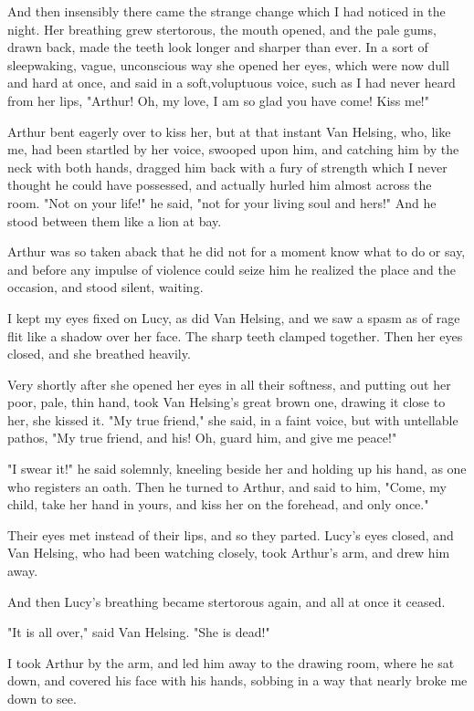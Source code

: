 And then insensibly there came the strange change which I had noticed in the night. Her breathing grew stertorous, the mouth opened, and the pale gums, drawn back, made the teeth look longer and sharper than ever. In a sort of sleepwaking, vague, unconscious way she opened her eyes, which were now dull and hard at once, and said in a soft,voluptuous voice, such as I had never heard from her lips, "Arthur! Oh, my love, I am so glad you have come! Kiss me!" 

Arthur bent eagerly over to kiss her, but at that instant Van Helsing, who, like me, had been startled by her voice, swooped upon him, and catching him by the neck with both hands, dragged him back with a fury of strength which I never thought he could have possessed, and actually hurled him almost across the room. "Not on your life!" he said, "not for your living soul and hers!" And he stood between them like a lion at bay. 

Arthur was so taken aback that he did not for a moment know what to do or say, and before any impulse of violence could seize him he realized the place and the occasion, and stood silent, waiting. 

I kept my eyes fixed on Lucy, as did Van Helsing, and we saw a spasm as of rage flit like a shadow over her face. The sharp teeth clamped together. Then her eyes closed, and she breathed heavily. 

Very shortly after she opened her eyes in all their softness, and putting out her poor, pale, thin hand, took Van Helsing's great brown one, drawing it close to her, she kissed it. "My true friend," she said, in a faint voice, but with untellable pathos, "My true friend, and his! Oh, guard him, and give me peace!" 

"I swear it!" he said solemnly, kneeling beside her and holding up his hand, as one who registers an oath. Then he turned to Arthur, and said to him, "Come, my child, take her hand in yours, and kiss her on the forehead, and only once." 

Their eyes met instead of their lips, and so they parted. Lucy's eyes closed, and Van Helsing, who had been watching closely, took Arthur's arm, and drew him away. 

And then Lucy's breathing became stertorous again, and all at once it ceased. 

"It is all over," said Van Helsing. "She is dead!" 

I took Arthur by the arm, and led him away to the drawing room, where he sat down, and covered his face with his hands, sobbing in a way that nearly broke me down to see. 

